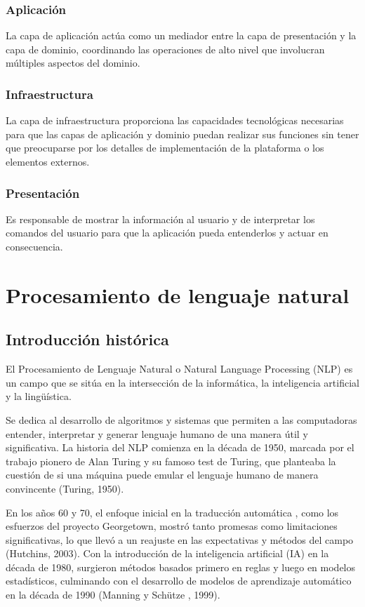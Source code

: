 \subsubsection*{Aplicación}
La capa de aplicación actúa como un mediador entre la capa de presentación y la capa de dominio, coordinando
las operaciones de alto nivel que involucran múltiples aspectos del dominio.

\subsubsection*{Infraestructura}
La capa de infraestructura proporciona las capacidades tecnológicas necesarias para que las capas de
aplicación y dominio puedan realizar sus funciones sin tener que
preocuparse por los detalles de implementación de la plataforma o los elementos externos.

\subsubsection*{Presentación}
Es responsable de mostrar la información al usuario y de interpretar los
comandos del usuario para que la aplicación pueda entenderlos y actuar en consecuencia.



\section{Procesamiento de lenguaje natural}

\subsection{Introducción histórica}
El Procesamiento de Lenguaje Natural o Natural Language Processing (NLP) es un campo que se sitúa en la
intersección de la informática, la inteligencia artificial y la lingüística.

Se dedica al desarrollo de algoritmos y sistemas que permiten a las computadoras entender, interpretar y generar
lenguaje humano de una manera útil y significativa. La historia del NLP comienza en la década de 1950, marcada
por el trabajo pionero de Alan Turing y su famoso
test de Turing, que planteaba la cuestión de si una máquina puede emular el lenguaje humano de manera convincente
(Turing, 1950).

En los años 60 y 70, el enfoque inicial en la traducción automática
, como los esfuerzos del proyecto Georgetown, mostró tanto promesas como limitaciones significativas, lo que llevó a un
reajuste en las expectativas y métodos del campo (Hutchins, 2003). Con la introducción de la inteligencia
artificial (IA) en la década de 1980, surgieron métodos basados primero en reglas y luego en modelos
estadísticos, culminando con el desarrollo de modelos de aprendizaje automático en la década de 1990 (Manning y Schütze
, 1999).

